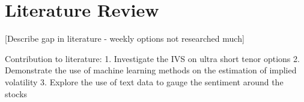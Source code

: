 \section{Literature Review} \label{literature_review}

[Describe gap in literature - weekly options not researched much]

Contribution to literature:
1. Investigate the IVS on ultra short tenor options
2. Demonstrate the use of machine learning methods on the estimation of implied volatility
3. Explore the use of text data to gauge the sentiment around the stocks 